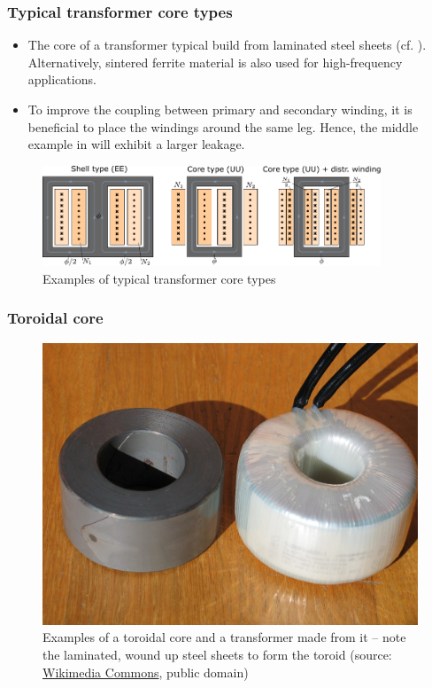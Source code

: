 \begin{frame}
	\frametitle{Typical transformer core types}
	\begin{itemize}
		\item The core of a transformer typical build from laminated steel sheets (cf. ). Alternatively, sintered ferrite material is also used for high-frequency applications.
		\item To improve the coupling between primary and secondary winding, it is beneficial to place the windings around the same leg. Hence, the middle example in  will exhibit a larger leakage.
	\end{itemize}
	\begin{figure}
		\includegraphics[width=0.9\textwidth]{fig/lec04/Transformer_cores.pdf}
		\caption{Examples of typical transformer core types}
		\label{fig:Transformer_cores}
	\end{figure}
\end{frame}

\begin{frame}
	\frametitle{Toroidal core}
	\begin{figure}
		\includegraphics[height=0.7\textheight]{fig/lec04/Laminated_core_and_toroidal_transformer.jpg}
		\caption{Examples of a toroidal core and a  transformer made from it -- note the laminated, wound up steel sheets to form the toroid (source: \href{https://commons.wikimedia.org/wiki/File:Kern_und_Ringkerntrafo_100VA.JPG}{Wikimedia Commons}, public domain)}
		\label{fig:Laminated_core_and_toroidal_transformer}
	\end{figure}
\end{frame}

